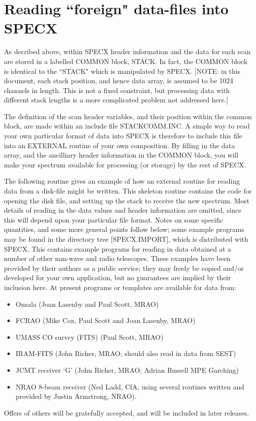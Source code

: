 \documentclass[11pt,twoside]{report}
\begin{document}
\section{Reading ``foreign" data-files into SPECX}

As decribed above, within SPECX header information and the data for
each scan are stored in a labelled COMMON block, STACK. In fact, the
COMMON block is identical to the ``STACK" which is manipulated by
SPECX. [NOTE: in this document, each stack position, and hence data
array, is assumed to be 1024 channels in length. This is not a fixed
constraint, but processing data with different stack lengths is a more
complicated problem not addressed here.]

The definition of the scan header variables, and their position within the
common block, are made within an include file
STACKCOMM.INC. A simple way to read your own particular
format of data into SPECX is therefore to include this file into an EXTERNAL
routine of your own composition. By filling in the data array, and the
ancilliary header information in the COMMON block, you will make your spectrum
available for processing (or storage) by the rest of SPECX.

The following routine gives an example of how an external routine for
reading data from a disk-file might be written. This skeleton routine
contains the code for opening the disk file, and setting up the stack
to receive the new spectrum. Most details of reading in the data
values and header information are omitted, since this will depend upon your
particular file format. Notes on some specific quantities, and some more
general points follow below; some example programs may be found in the
directory tree [SPECX.IMPORT], which is distributed with SPECX.
This contains example programs for reading in data obtained at a
number of other mm-wave and radio telescopes. These examples have been
provided by their authors as a public service; they may freely be copied
and/or developed for your own application, but no guarantees are implied
by their inclusion here. At present programs or templates are available for
data from:
\begin{itemize}
   \item Onsala (Joan Lasenby and Paul Scott, MRAO)
   \item FCRAO (Mike Cox, Paul Scott and Joan Lasenby, MRAO)
   \item UMASS CO survey (FITS) (Paul Scott, MRAO)
   \item IRAM-FITS (John Richer, MRAO; should also read in data from SEST)
   \item JCMT receiver `G' (John Richer, MRAO; Adrian Russell MPE Garching)
   \item NRAO 8-beam receiver (Ned Ladd, CfA, using several routines
         written and provided by Justin Armstrong, NRAO).
\end{itemize}
Offers of others will be gratefully accepted, and will be included in later
releases.
\end{document}
